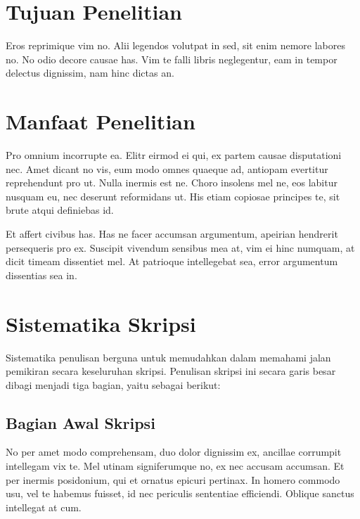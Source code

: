 \section{Tujuan Penelitian}
Eros reprimique vim no. Alii legendos volutpat in sed, sit enim nemore labores no. No odio decore causae has. Vim te falli libris neglegentur, eam in tempor delectus dignissim, nam hinc dictas an.


\section{Manfaat Penelitian}
Pro omnium incorrupte ea. Elitr eirmod ei qui, ex partem causae disputationi nec. Amet dicant no vis, eum modo omnes quaeque ad, antiopam evertitur reprehendunt pro ut. Nulla inermis est ne. Choro insolens mel ne, eos labitur nusquam eu, nec deserunt reformidans ut. His etiam copiosae principes te, sit brute atqui definiebas id.

Et affert civibus has. Has ne facer accumsan argumentum, apeirian hendrerit persequeris pro ex. Suscipit vivendum sensibus mea at, vim ei hinc numquam, at dicit timeam dissentiet mel. At patrioque intellegebat sea, error argumentum dissentias sea in.

\section{Sistematika Skripsi}
Sistematika penulisan berguna untuk memudahkan dalam memahami jalan pemikiran secara keseluruhan skripsi. Penulisan skripsi ini secara garis besar dibagi menjadi tiga bagian, yaitu sebagai berikut:

\subsection{Bagian Awal Skripsi}
No per amet modo comprehensam, duo dolor dignissim ex, ancillae corrumpit intellegam vix te. Mel utinam signiferumque no, ex nec accusam accumsan. Et per inermis posidonium, qui et ornatus epicuri pertinax. In homero commodo usu, vel te habemus fuisset, id nec periculis sententiae efficiendi. Oblique sanctus intellegat at cum. \\

